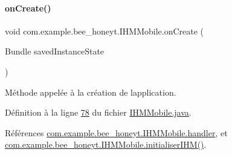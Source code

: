 \mbox{\label{classcom_1_1example_1_1bee__honeyt_1_1_i_h_m_mobile_af487b0250bfc0e873fe3a4f495c3ef5e}} 
\paragraph{\texorpdfstring{on\+Create()}{onCreate()}}
{\footnotesize\ttfamily void com.\+example.\+bee\+\_\+honeyt.\+I\+H\+M\+Mobile.\+on\+Create (\begin{DoxyParamCaption}\item[{Bundle}]{saved\+Instance\+State }\end{DoxyParamCaption})\hspace{0.3cm}{\ttfamily [protected]}}



Méthode appelée à la création de l\textquotesingle{}application. 



Définition à la ligne \hyperlink{_i_h_m_mobile_8java_source_l00078}{78} du fichier \hyperlink{_i_h_m_mobile_8java_source}{I\+H\+M\+Mobile.\+java}.



Références \hyperlink{_i_h_m_mobile_8java_source_l00322}{com.\+example.\+bee\+\_\+honeyt.\+I\+H\+M\+Mobile.\+handler}, et \hyperlink{_i_h_m_mobile_8java_source_l00152}{com.\+example.\+bee\+\_\+honeyt.\+I\+H\+M\+Mobile.\+initialiser\+I\+H\+M()}.


